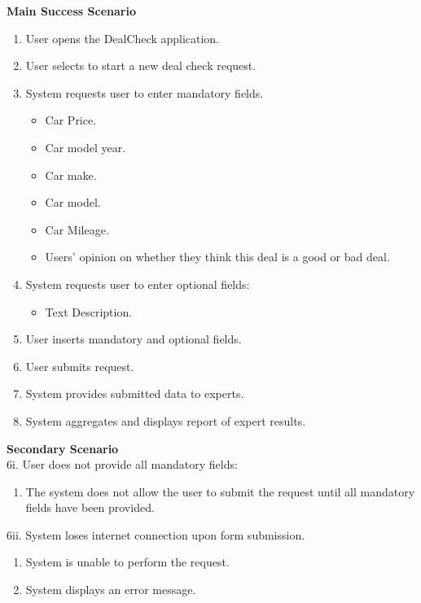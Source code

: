\documentclass[]{article}
\begin{document}
\begin{enumerate}
\begin{enumerate}[{\bf {BE}1.}]
    {\bf Main Success Scenario}
        \begin{enumerate}[1.]
            \item User opens the DealCheck application.
            \item User selects to start a new deal check request.
            \item System requests user to enter mandatory fields.
            \begin{itemize}
                \item Car Price.
                \item Car model year.
                \item Car make.
                \item Car model.
                \item Car Mileage.
                \item Users' opinion on whether they think this deal is a good or bad deal.
            \end{itemize}
            \item System requests user to enter optional fields:
            \begin{itemize}
                \item Text Description.
            \end{itemize}
            \item User inserts mandatory and optional fields.
            \item User submits request.
            \item System provides submitted data to experts.
            \item System aggregates and displays report of expert results.
        \end{enumerate}
        
        {\bf Secondary Scenario} \\
        6i. User does not provide all mandatory fields:
        \begin{enumerate}[{6i}.1]
            \item The system does not allow the user to submit the request until all mandatory fields have been provided.
        \end{enumerate}
    
        6ii. System loses internet connection upon form submission.
        \begin{enumerate}[{6ii}.1]
            \item System is unable to perform the request.
            \item System displays an error message.
        \end{enumerate}
    

\end{enumerate}
\end{enumerate}
\end{document}

